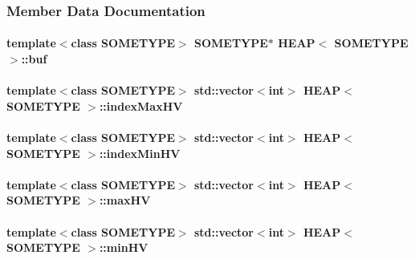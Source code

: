\subsubsection{Member Data Documentation}
\hypertarget{classHEAP_abe5af2e4e8f2bc55e5b2e70ffa43e630}{
\paragraph[{buf}]{\setlength{\rightskip}{0pt plus 5cm}template$<$class S\+O\+M\+E\+T\+Y\+P\+E$>$ S\+O\+M\+E\+T\+Y\+P\+E$\ast$ {\bf H\+E\+A\+P}$<$ S\+O\+M\+E\+T\+Y\+P\+E $>$\+::buf}}\label{classHEAP_abe5af2e4e8f2bc55e5b2e70ffa43e630}
\hypertarget{classHEAP_af6c485575f29a80d91f611af87b7f6b8}{
\paragraph[{index\+Max\+H\+V}]{\setlength{\rightskip}{0pt plus 5cm}template$<$class S\+O\+M\+E\+T\+Y\+P\+E$>$ std\+::vector$<$int$>$ {\bf H\+E\+A\+P}$<$ S\+O\+M\+E\+T\+Y\+P\+E $>$\+::index\+Max\+H\+V}}\label{classHEAP_af6c485575f29a80d91f611af87b7f6b8}
\hypertarget{classHEAP_adc22726c34c72025819274f63d8bb418}{
\paragraph[{index\+Min\+H\+V}]{\setlength{\rightskip}{0pt plus 5cm}template$<$class S\+O\+M\+E\+T\+Y\+P\+E$>$ std\+::vector$<$int$>$ {\bf H\+E\+A\+P}$<$ S\+O\+M\+E\+T\+Y\+P\+E $>$\+::index\+Min\+H\+V}}\label{classHEAP_adc22726c34c72025819274f63d8bb418}
\hypertarget{classHEAP_a33776b33a838c2116349c676ac2a7249}{
\paragraph[{max\+H\+V}]{\setlength{\rightskip}{0pt plus 5cm}template$<$class S\+O\+M\+E\+T\+Y\+P\+E$>$ std\+::vector$<$int$>$ {\bf H\+E\+A\+P}$<$ S\+O\+M\+E\+T\+Y\+P\+E $>$\+::max\+H\+V}}\label{classHEAP_a33776b33a838c2116349c676ac2a7249}
\hypertarget{classHEAP_a541eab0dba5cd90e27be6083b1a1979f}{
\paragraph[{min\+H\+V}]{\setlength{\rightskip}{0pt plus 5cm}template$<$class S\+O\+M\+E\+T\+Y\+P\+E$>$ std\+::vector$<$int$>$ {\bf H\+E\+A\+P}$<$ S\+O\+M\+E\+T\+Y\+P\+E $>$\+::min\+H\+V}}\label{classHEAP_a541eab0dba5cd90e27be6083b1a1979f}
